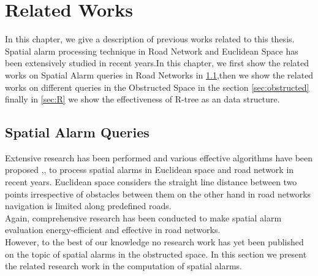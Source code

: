 \chapter{Related Works}
\label{chp:relworks}
In this chapter, we give a description of previous works related to this thesis. Spatial alarm processing technique in Road Network and Euclidean Space has been extensively studied in recent years.In this chapter, we first show the related works on Spatial Alarm queries in Road Networks in \ref{sec:spatialalarms},then we show the related works on different queries in the Obstructed Space in the section \ref{sec:obstructed} finally in \ref{sec:R} we show the effectiveness of R-tree as an data structure. \\
\vspace{15pt}

\section{Spatial Alarm Queries}
\label{sec:spatialalarms}
Extensive research has been performed and various  effective algorithms have been proposed \cite{roadalarm},\cite{mur},\cite{bamba} to process spatial alarms in Euclidean space and road network in recent years. Euclidean space considers the straight line distance between two points irrespective of obstacles between them on the other hand in road networks navigation is limited along predefined roads.\\ %
Again, comprehensive research \cite{liu} has been conducted to make spatial alarm evaluation energy-efficient and effective in road networks.\\ 
However, to the best of our knowledge no research work has yet been published on the topic of spatial alarms in the obstructed space.
In this section we present the related research work in the computation of spatial alarms.\\

